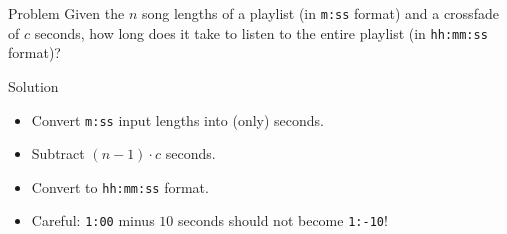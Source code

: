 \begin{slide}
	\begin{block}{Problem}
		Given the $n$ song lengths of a playlist (in \texttt{m:ss} format) and a crossfade of $c$ seconds, how long does it take to listen to the entire playlist (in \texttt{hh:mm:ss} format)?
	\end{block}
	\pause
	\begin{block}{Solution}
		\begin{itemize}
			\item Convert \texttt{m:ss} input lengths into (only) seconds.
			\item Subtract $(n-1) \cdot c$ seconds.
			\item Convert to \texttt{hh:mm:ss} format.
			\item Careful: \texttt{1:00} minus $10$ seconds should not become \texttt{1:-10}!
		\end{itemize}
	\end{block}
\end{slide} 
